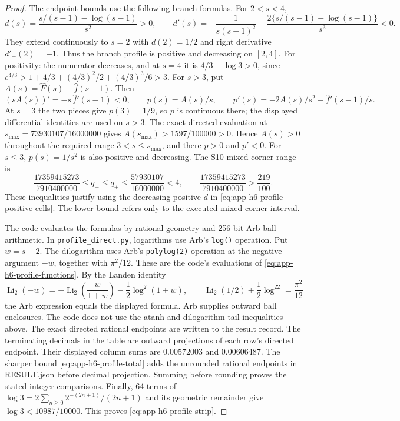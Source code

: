 \begin{proof}
The endpoint bounds use the following branch formulas. For $2<s<4$,
\[
 d(s)=\frac{s/(s-1)-\log(s-1)}{s^2}>0,\qquad
 d'(s)=-\frac1{s(s-1)^2}
       -\frac{2\{s/(s-1)-\log(s-1)\}}{s^3}<0.
\]
They extend continuously to $s=2$ with $d(2)=1/2$ and right derivative
$d'_+(2)=-1$. Thus the branch profile is positive and decreasing on $[2,4]$.
For positivity: the numerator decreases, and at $s=4$ it is
$4/3-\log3>0$, since
$e^{4/3}>1+4/3+(4/3)^2/2+(4/3)^3/6>3$. For $s>3$, put
$A(s)=\widehat F(s)-\widehat f(s-1)$. Then
\[
 (sA(s))'=-s\,\widehat f'(s-1)<0,\qquad
 p(s)=A(s)/s,\qquad
 p'(s)=-2A(s)/s^2-\widehat f'(s-1)/s.
\]
At $s=3$ the two pieces give $p(3)=1/9$, so $p$ is continuous
there; the displayed differential identities are used on $s>3$.
The exact directed evaluation at
$s_{\max}=73930107/16000000$ gives
$A(s_{\max})>1597/100000>0$. Hence $A(s)>0$ throughout the required
range $3<s\le s_{\max}$, and there $p>0$ and $p'<0$. For $s\le3$,
$p(s)=1/s^2$ is also positive and decreasing. The S10 mixed-corner range is
\[
 \frac{17359415273}{7910400000}\le q_-\le q_+
 \le\frac{57930107}{16000000}<4,
 \qquad \frac{17359415273}{7910400000}>\frac{219}{100}.
\]
These inequalities justify using the decreasing positive $d$ in
\eqref{eq:app-h6-profile-positive-cells}. The lower bound refers only to the
executed mixed-corner interval.

The code evaluates the formulas by rational geometry and 256-bit Arb
ball arithmetic. In \texttt{profile\_direct.py}, logarithms use Arb's
\texttt{log()} operation. Put $w=s-2$. The dilogarithm uses Arb's
\texttt{polylog(2)} operation at the negative argument $-w$, together with
$\pi^2/12$. These are the code's evaluations of
\eqref{eq:app-h6-profile-functions}. By the Landen identity
\[
 \operatorname{Li}_2(-w)
 =-\operatorname{Li}_2\!\left(\frac{w}{1+w}\right)
  -\frac12\log^2(1+w),\qquad
 \operatorname{Li}_2(1/2)+\frac12\log^22=\frac{\pi^2}{12}
\]
the Arb expression equals the displayed formula. Arb supplies
outward ball enclosures. The code does not use the atanh and
dilogarithm tail inequalities above. The exact directed rational
endpoints are written to the result record. The terminating decimals in the
table are outward projections of each row's directed endpoint. Their displayed
column sums are $0.00572003$ and $0.00606487$. The sharper bound
\eqref{eq:app-h6-profile-total} adds the unrounded rational endpoints
in RESULT.json before decimal projection. Summing before rounding proves the stated
integer comparisons. Finally, 64 terms of
$\log3=2\sum_{n\ge0}2^{-(2n+1)}/(2n+1)$ and its geometric remainder give
$\log3<10987/10000$. This proves \eqref{eq:app-h6-profile-strip}.
\end{proof}

